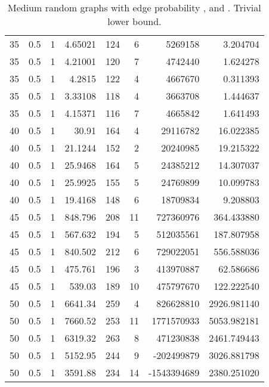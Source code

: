 \documentclass[a4paper,11pt]{article}
\begin{document}
\begin{table}
\begin{center}
\begin{tabular}{|rrr|r|r|rr|r|}
\hline
35 & 0.5 & 1 & 4.65021 & 124 & 6 & 5269158 & 3.204704 \\
35 & 0.5 & 1 & 4.21001 & 120 & 7 & 4742440 & 1.624278 \\
35 & 0.5 & 1 & 4.2815 & 122 & 4 & 4667670 & 0.311393 \\
35 & 0.5 & 1 & 3.33108 & 118 & 4 & 3663708 & 1.444637 \\
35 & 0.5 & 1 & 4.15371 & 116 & 7 & 4665842 & 1.641493 \\
40 & 0.5 & 1 & 30.91 & 164 & 4 & 29116782 & 16.022385 \\
40 & 0.5 & 1 & 21.1244 & 152 & 2 & 20240985 & 19.215322 \\
40 & 0.5 & 1 & 25.9468 & 164 & 5 & 24385212 & 14.307037 \\
40 & 0.5 & 1 & 25.9925 & 155 & 5 & 24769899 & 10.099783 \\
40 & 0.5 & 1 & 19.4168 & 148 & 6 & 18709834 & 9.208803 \\
45 & 0.5 & 1 & 848.796 & 208 & 11 & 727360976 & 364.433880 \\
45 & 0.5 & 1 & 567.632 & 194 & 5 & 512035561 & 187.807958 \\
45 & 0.5 & 1 & 840.502 & 212 & 6 & 729022051 & 556.588036 \\
45 & 0.5 & 1 & 475.761 & 196 & 3 & 413970887 & 62.586686 \\
45 & 0.5 & 1 & 539.03 & 189 & 10 & 475797670 & 122.222540 \\
50 & 0.5 & 1 & 6641.34 & 259 & 4 & 826628810 & 2926.981140 \\
50 & 0.5 & 1 & 7660.52 & 253 & 11 & 1771570933 & 5053.982181 \\
50 & 0.5 & 1 & 6319.32 & 263 & 8 & 471230838 & 2461.749443 \\
50 & 0.5 & 1 & 5152.95 & 244 & 9 & -202499879 & 3026.881798 \\
50 & 0.5 & 1 & 3591.88 & 234 & 14 & -1543394689 & 2380.251020 \\
\hline
\end{tabular}
\end{center}
\caption{Medium random graphs with edge probability ,
   and . Trivial lower bound.}
\label{tab:medium-norebal}
\end{table}
\end{document}
